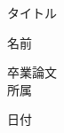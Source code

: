 \documentclass[a4paper,12pt]{ltjsreport}
\begin{document}
\begin{titlepage}
  \begin{center}

    \vspace*{2cm}

    \begin{LARGE}
      タイトル
    \end{LARGE}

    \vspace*{4cm}

    \begin{Large}
      名前\\

      \vspace*{3cm}

      卒業論文\\
      所属\\

      \vspace*{2cm}

      日付\\
    \end{Large}
  \end{center}
\end{titlepage}
\end{document}
